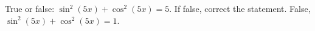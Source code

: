 {True or false: $\sin^2{(5x)} + \cos^2{(5x)} =5$. If false, correct the statement.}
{False, $\sin^2{(5x)} + \cos^2{(5x)} = 1$.}
